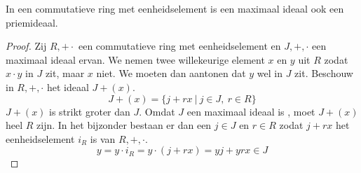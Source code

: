 \documentclass[main.tex]{subfiles}
\begin{document}
\begin{ei}
  In een commutatieve ring met eenheidselement is een maximaal ideaal ook een priemideaal.

  \begin{proof}
    Zij $R,+\cdot$ een commutatieve ring met eenheidselement en $J,+,\cdot$ een maximaal ideaal ervan.
    We nemen twee willekeurige element $x$ en $y$ uit $R$ zodat $x\cdot y$ in $J$ zit, maar $x$ niet.
    We moeten dan aantonen dat $y$ wel in $J$ zit.
    Beschouw in $R,+,\cdot$ het ideaal $J+(x)$.
    \[ J + (x) = \{ j + rx\ |\ j\in J,\ r\in R \} \]
    $J+(x)$ is strikt groter dan $J$. \waarom
    Omdat $J$ een maximaal ideaal is , moet $J+(x)$ heel $R$ zijn. \waarom
    In het bijzonder bestaan er dan een $j\in J$ en $r\in R$ zodat $j+rx$ het eenheidselement $i_{R}$ is van $R,+,\cdot$.
    \[ y = y\cdot i_{R} = y \cdot (j+rx) = yj + yrx \in J \]
  \end{proof}
\end{ei}
\end{document}
